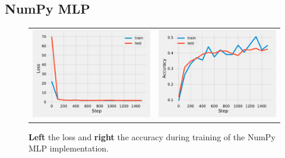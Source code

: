 \documentclass{article}
\newcommand\·{\ensuremath{\cdot}}
\newcommand\…{\ensuremath{\ldots}}
\newcommand\1{\ensuremath{\mathds{1}}}
\begin{document}
\subsection{NumPy MLP}
\begin{figure}
  \begin{tabularx}{\linewidth}{XX}
    \includegraphics[width=\linewidth]{assignment_1/code/np_loss.pdf} &
    \includegraphics[width=\linewidth]{assignment_1/code/np_accuracy.pdf}
  \end{tabularx}
  \caption{\textbf{Left} the loss and \textbf{right} the accuracy during training of the NumPy MLP implementation.}
  \label{fig:numpy}
\end{figure}
\end{document}
